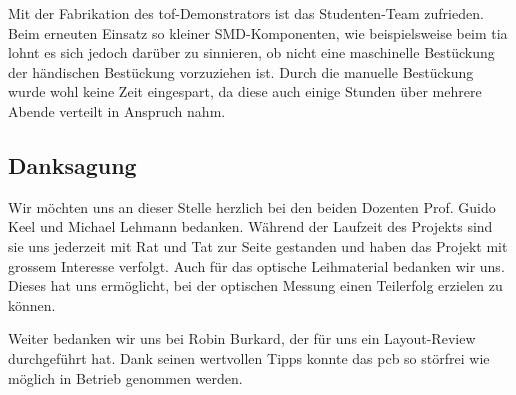 Mit der Fabrikation des \acrshort{tof}-Demonstrators ist das Studenten-Team zufrieden. Beim erneuten Einsatz so kleiner
SMD-Komponenten, wie beispielsweise beim \acrshort{tia} lohnt es sich jedoch darüber zu sinnieren, ob nicht eine
maschinelle Bestückung der händischen Bestückung vorzuziehen ist. Durch die manuelle Bestückung wurde wohl keine Zeit
eingespart, da diese auch einige Stunden über mehrere Abende verteilt in Anspruch nahm.

\subsection{Danksagung}

Wir möchten uns an dieser Stelle herzlich bei den beiden Dozenten Prof. Guido Keel und Michael Lehmann bedanken. Während
der Laufzeit des Projekts sind sie uns jederzeit mit Rat und Tat zur Seite gestanden und haben das Projekt mit grossem
Interesse verfolgt. Auch für das optische Leihmaterial bedanken wir uns. Dieses hat uns ermöglicht, bei der optischen
Messung einen Teilerfolg erzielen zu können.

Weiter bedanken wir uns bei Robin Burkard, der für uns ein Layout-Review durchgeführt hat. Dank seinen wertvollen Tipps
konnte das \acrshort{pcb} so störfrei wie möglich in Betrieb genommen werden.
